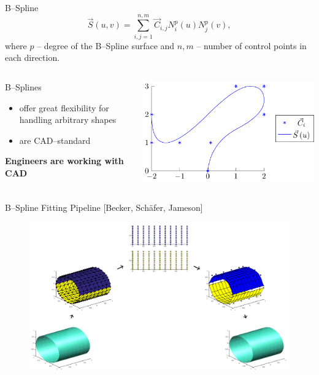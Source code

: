 \newcommand{\norm}[1]{\parallel #1 \parallel_2}
\begin{frame}{B--Spline}
\begin{equation*}
\vec{S}\left(u,v\right)=\sum\limits_{i,j=1}^{n,m} \vec{C}_{i,j} N_i^p\left(u\right) N_j^p\left(v\right),
\end{equation*}
where $p$ -- degree of the B--Spline surface and $n,m$ -- number of control points in each direction.
\begin{columns}
\begin{column}{.45\textwidth}
B--Splines
\begin{itemize}
\item offer great flexibility for handling arbitrary shapes
\item are CAD--standard
\end{itemize}
\textbf{Engineers are working with CAD}
\end{column}
\begin{column}{.45\textwidth}
\includegraphics[width=\textwidth]{Pictures/BSplineEx/example.pdf}
\end{column}
\end{columns}
\end{frame}
\begin{frame}{B--Spline Fitting Pipeline [Becker, Schäfer, Jameson]}
\begin{figure}
\includegraphics[scale=0.25]{Pictures/NURBS/TheArc.png}
\end{figure}
        
\end{frame}

